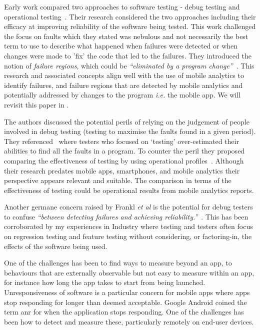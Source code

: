 Early work compared two approaches to software testing - debug testing and operational testing~. Their research considered the two approaches including their efficacy at improving reliability of the software being tested. This work challenged the focus on faults which they stated was nebulous and not necessarily the best term to use to describe what happened when failures were detected or when changes were made to 'fix' the code that led to the failures. They introduced the notion of \emph{failure regions}, which could be \emph{``eliminated by a program change''}~. This research and associated concepts align well with the use of mobile analytics to identify failures, and failure regions that are detected by mobile analytics and potentially addressed by changes to the program \emph{i.e.} the mobile app. We will revisit this paper in .

The authors discussed the potential perils of relying on the judgement of people involved in debug testing (testing to maximise the faults found in a given period). They referenced~ where testers who focused on `testing' over-estimated their abilities to find all the faults in a program. To counter the peril they proposed comparing the effectiveness of testing by using operational profiles~. Although their research predates mobile apps, smartphones, and mobile analytics their perspective appears relevant and suitable. The comparison in terms of the effectiveness of testing could be operational results from mobile analytics reports.

Another germane concern raised by Frankl \emph{et al} is the potential for debug testers to confuse \emph{``between detecting failures and achieving reliability.''}~. This has been corroborated by my experiences in Industry where testing and testers often focus on regression testing and feature testing without considering, or factoring-in, the effects of the software being used.


One of the challenges has been to find ways to measure beyond an app, to behaviours that are externally observable but not easy to measure within an app, for instance how long the app takes to start from being launched. Unresponsiveness of software is a particular concern for mobile apps where apps stop responding for longer than deemed acceptable. Google Android coined the term \Gls{anr} for when the application stops responding. One of the challenges has been how to detect and measure these, particularly remotely on end-user devices. 


